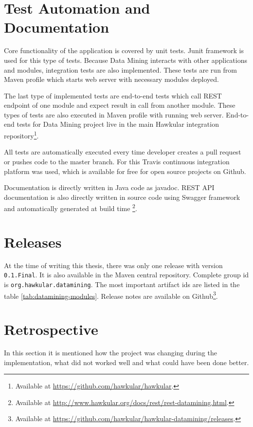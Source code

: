     \section{Test Automation and Documentation}
    Core functionality of the application is covered by unit tests. Junit framework is used for this type of tests.
    Because Data Mining interacts with other applications and modules, integration tests are also implemented. These
    tests are run from Maven profile which starts web server with necessary modules deployed.

    The last type of implemented tests are end-to-end tests which call REST endpoint of one module and expect result
    in call from another module. These types of tests are also executed in Maven profile with running web server.
    End-to-end tests for Data Mining project live in the main Hawkular integration repository\footnote{
    Available at \url{https://github.com/hawkular/hawkular}.}.

    All tests are automatically executed every time developer creates a pull request or pushes code to the master
    branch. For this Travis continuous integration platform was used, which is available for free for open source
    projects on Github.

    Documentation is directly written in Java code as javadoc. REST API documentation is also directly
    written in source code using Swagger framework and automatically generated at build time
    \footnote{Available at \url{http://www.hawkular.org/docs/rest/rest-datamining.html}.}.

    \section{Releases}
    At the time of writing this thesis, there was only one release with version \texttt{0.1.Final}. It is also available
    in the Maven central repository. Complete group id is \texttt{org.hawkular.datamining}. The most important
    artifact ids are listed in the table \ref{tab:datamining-modules}. Release notes are available on
    Github\footnote{Available at \url{https://github.com/hawkular/hawkular-datamining/releases}.}.

    \section{Retrospective}
    In this section it is mentioned how the project was changing during the implementation, what did not worked well and
    what could have been done better.

